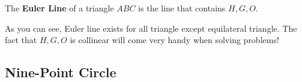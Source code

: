 \documentclass[../../main.tex]{subfiles}
\begin{document}
\begin{definition}{}{}
The \textbf{Euler Line} of a triangle $ABC$ is the line that contains
$H, G, O$.
\end{definition}

As you can see, Euler line exists for all triangle except equilateral
triangle. The fact that $H, G, O$ is collinear will come very handy
when solving problems!

\subsection{Nine-Point Circle}
\end{document}
